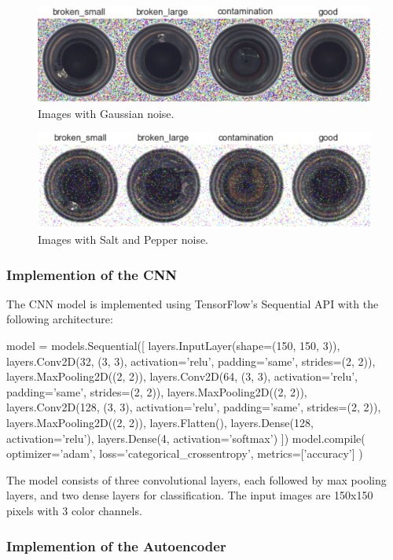 \begin{figure}[H]
    \centering
    \includegraphics[scale=0.55]{src/images/dataset_w_gnoise.png}
    \caption{Images with Gaussian noise.}
    \label{fig:Gnoise}
\end{figure}
\begin{figure}[H]
    \centering
    \includegraphics[scale=0.55]{src/images/dataset_w_snp.png}
    \caption{Images with Salt and Pepper noise.}
    \label{fig:snpnoise}
\end{figure}

\subsubsection{Implemention of the CNN} %
The CNN model is implemented using TensorFlow's Sequential API with the following architecture:
\vspace{0.3cm}
\begin{python}
model = models.Sequential([
    layers.InputLayer(shape=(150, 150, 3)), 
    layers.Conv2D(32, (3, 3), activation='relu', padding='same', strides=(2, 2)),
    layers.MaxPooling2D((2, 2)),
    layers.Conv2D(64, (3, 3), activation='relu', padding='same', strides=(2, 2)),
    layers.MaxPooling2D((2, 2)),
    layers.Conv2D(128, (3, 3), activation='relu', padding='same', strides=(2, 2)),
    layers.MaxPooling2D((2, 2)),
    layers.Flatten(),
    layers.Dense(128, activation='relu'),
    layers.Dense(4, activation='softmax')
])
model.compile(
    optimizer='adam',
    loss='categorical_crossentropy',
    metrics=['accuracy']
)
\end{python}

The model consists of three convolutional layers, each followed by max pooling layers, and two dense layers for classification. The input images are 150x150 pixels with 3 color channels.
\subsubsection{Implemention of the Autoencoder}


